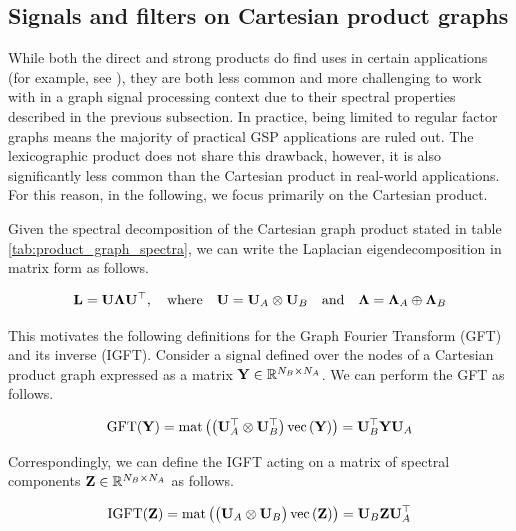 \subsection{Signals and filters on Cartesian product graphs}

\label{sec:gsp_cpg}

While both the direct and strong products do find uses in certain applications (for example, see \citep{Kaveh2011}), they are both less common and more challenging to work with in a graph signal processing context due to their spectral properties described in the previous subsection. In practice, being limited to regular factor graphs means the majority of practical GSP applications are ruled out. The lexicographic product does not share this drawback, however, it is also significantly less common than the Cartesian product in real-world applications. For this reason, in the following, we focus primarily on the Cartesian product.

Given the spectral decomposition of the Cartesian graph product stated in table \ref{tab:product_graph_spectra}, we can write the Laplacian eigendecomposition in matrix form as follows.

\begin{equation}
    \mathbf{L} = \mathbf{U} \mathbf{\Lambda} \mathbf{U}^\top, \quad \text{where} \quad \mathbf{U} = \mathbf{U}_A \otimes \mathbf{U}_B \quad \text{and} \quad \mathbf{\Lambda} = \mathbf{\Lambda}_A \oplus \mathbf{\Lambda}_B
\end{equation}

This motivates the following definitions for the Graph Fourier Transform (GFT) and its inverse (IGFT). Consider a signal defined over the nodes of a Cartesian product graph expressed as a matrix $\mathbf{Y} \in \mathbb{R}^{N_B \times N_A}$. We can perform the GFT as follows.


\begin{equation}
    \label{eq:GFT_2d}
    \text{GFT}(\mathbf{Y}) = \text{\textup{mat}}\left(\big( \mathbf{U}_A^\top \otimes \mathbf{U}_B^\top \big) \, \text{\textup{vec}}\left(\mathbf{Y}\right)\right) = \mathbf{U}_B^\top \mathbf{Y} \mathbf{U}_A
\end{equation}

Correspondingly, we can define the IGFT acting on a matrix of spectral components $\mathbf{Z} \in \mathbb{R}^{N_B \times N_A}$ as follows.

\begin{equation}
    \label{eq:IGFT_2d}
    \text{IGFT}(\mathbf{Z}) = \text{\textup{mat}}\left(\big( \mathbf{U}_A \otimes \mathbf{U}_B \big)\,\text{\textup{vec}}\left(\mathbf{Z}\right)\right) = \mathbf{U}_B \mathbf{Z} \mathbf{U}_A^\top
\end{equation}


